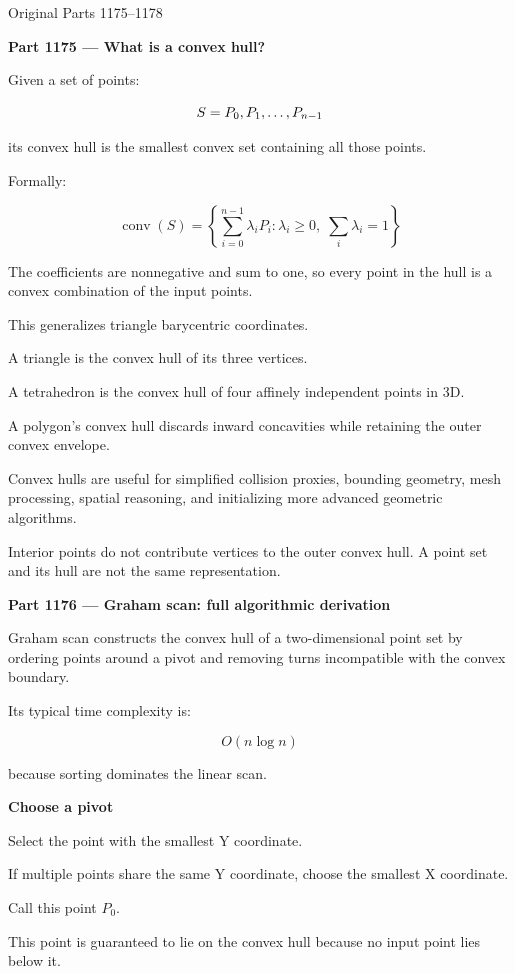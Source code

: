 Original Parts 1175--1178

\textbf{Part 1175 --- What is a convex hull?}

Given a set of points:

\[
S=\\{P_0,P_1,\ldots,P_{n-1}\\}
\]

its convex hull is the smallest convex set containing all those points.

Formally:

\[
\boxed{ \operatorname{conv}(S)= \left\{ \sum_{i=0}^{n-1}\lambda_iP_i: \lambda_i\ge0,\; \sum_i\lambda_i=1 \right\} }
\]

The coefficients are nonnegative and sum to one, so every point in the hull is a convex combination of the input points.

This generalizes triangle barycentric coordinates.

A triangle is the convex hull of its three vertices.

A tetrahedron is the convex hull of four affinely independent points in 3D.

A polygon's convex hull discards inward concavities while retaining the outer convex envelope.

Convex hulls are useful for simplified collision proxies, bounding geometry, mesh processing, spatial reasoning, and initializing more advanced geometric algorithms.

Interior points do not contribute vertices to the outer convex hull. A point set and its hull are not the same representation.

\textbf{Part 1176 --- Graham scan: full algorithmic derivation}

Graham scan constructs the convex hull of a two-dimensional point set by ordering points around a pivot and removing turns incompatible with the convex boundary.

Its typical time complexity is:

\[
\boxed{O(n\log n)}
\]

because sorting dominates the linear scan.

\textbf{Choose a pivot}

Select the point with the smallest Y coordinate.

If multiple points share the same Y coordinate, choose the smallest X coordinate.

Call this point \(P_0\).

This point is guaranteed to lie on the convex hull because no input point lies below it.

